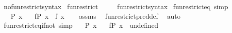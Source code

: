\begin{isabellebody}
\isamarkupfalse%
\isanewline
{}\isamarkupfalse%
\ no{\isacharunderscore}{\kern0pt}fun{\isacharunderscore}{\kern0pt}restrict{\isacharunderscore}{\kern0pt}syntax\isanewline
{}\isanewline
{}\isamarkupfalse%
\ fun{\isacharunderscore}{\kern0pt}restrict\ {\isacharparenleft}{\kern0pt}{\isachardoublequoteopen}{\isacharparenleft}{\kern0pt}{\isacharunderscore}{\kern0pt}{\isacharparenright}{\kern0pt}{\isasymrestriction}{\isacharparenleft}{\kern0pt}\isactrlbsub {\isacharunderscore}{\kern0pt}\isactrlesub {\isacharparenright}{\kern0pt}{\isachardoublequoteclose}\ {\isacharbrackleft}{\kern0pt}{}{}{}{}{\isacharbrackright}{\kern0pt}{\isacharparenright}{\kern0pt}\isanewline
{}\isamarkupfalse%
\isanewline
\isanewline
{}\isamarkupfalse%
\isanewline
\ \ \ fun{\isacharunderscore}{\kern0pt}restrict{\isacharunderscore}{\kern0pt}syntax\isanewline
{}\isanewline
\isanewline
{}\isamarkupfalse%
\ fun{\isacharunderscore}{\kern0pt}restrict{\isacharunderscore}{\kern0pt}eq\ {\isacharbrackleft}{\kern0pt}simp{\isacharbrackright}{\kern0pt}{\isacharcolon}{\kern0pt}\isanewline
\ \ \ {\isachardoublequoteopen}P\ x{\isachardoublequoteclose}\isanewline
\ \ \ {\isachardoublequoteopen}f{\isasymrestriction}\isactrlbsub P\isactrlesub \ x\ {\isacharequal}{\kern0pt}\ f\ x{\isachardoublequoteclose}\isanewline
%
\isadelimproof
\ \ %
\endisadelimproof
%
\isatagproof
{}\isamarkupfalse%
\ assms\ \isamarkupfalse%
\ fun{\isacharunderscore}{\kern0pt}restrict{\isacharunderscore}{\kern0pt}pred{\isacharunderscore}{\kern0pt}def\ \isamarkupfalse%
\ auto%
\endisatagproof
{\isafoldproof}%
%
\isadelimproof
\isanewline
%
\endisadelimproof
\isanewline
{}\isamarkupfalse%
\ fun{\isacharunderscore}{\kern0pt}restrict{\isacharunderscore}{\kern0pt}eq{\isacharunderscore}{\kern0pt}if{\isacharunderscore}{\kern0pt}not\ {\isacharbrackleft}{\kern0pt}simp{\isacharbrackright}{\kern0pt}{\isacharcolon}{\kern0pt}\isanewline
\ \ \ {\isachardoublequoteopen}{\isasymnot}{\isacharparenleft}{\kern0pt}P\ x{\isacharparenright}{\kern0pt}{\isachardoublequoteclose}\isanewline
\ \ \ {\isachardoublequoteopen}f{\isasymrestriction}\isactrlbsub P\isactrlesub \ x\ {\isacharequal}{\kern0pt}\ undefined{\isachardoublequoteclose}\isanewline
%
\isadelimproof
\ \ %
\endisadelimproof
%
\isatagproof

\end{isabellebody}

